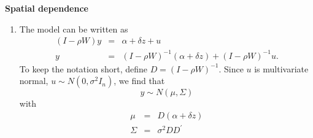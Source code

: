 \documentclass{article}
\begin{document}
\begin{solution}
\textbf{Spatial dependence }

\begin{enumerate}
\item The model can be written as%
\begin{eqnarray*}
\left( I-\rho W\right) y &=&\alpha +\delta z+u \\
y &=&\left( I-\rho W\right) ^{-1}\left( \alpha +\delta z\right) +\left(
I-\rho W\right) ^{-1}u.
\end{eqnarray*}%
To keep the notation short, define $D=\left( I-\rho W\right) ^{-1}$. Since $u
$ is multivariate normal, $u\sim N(0,\sigma ^{2}I_{n})$, we find that%
\begin{equation*}
y\sim N\left( \mu ,\Sigma \right)
\end{equation*}%
with%
\begin{eqnarray*}
\mu  &=&D\left( \alpha +\delta z\right)  \\
\Sigma  &=&\sigma ^{2}DD^{\prime }
\end{eqnarray*}


\end{enumerate}
\end{solution}
\end{document}
